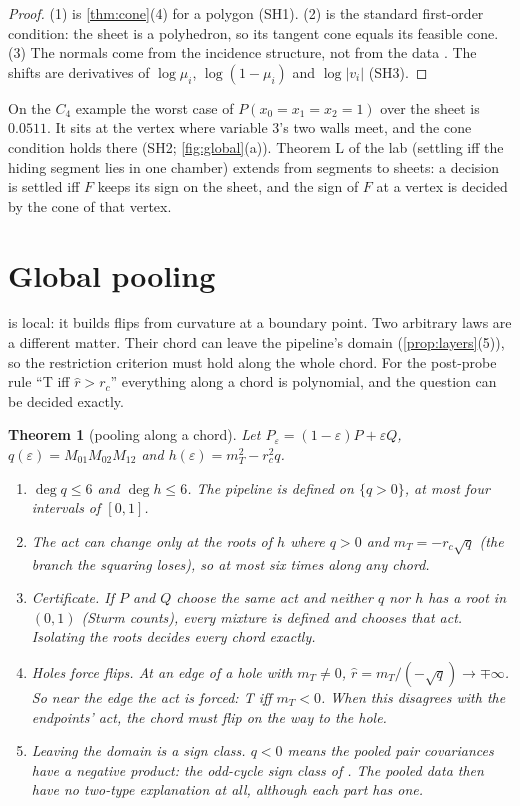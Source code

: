 \documentclass[11pt]{article}
\newtheorem{theorem}{Theorem}\newtheorem{proposition}[theorem]{Proposition}\newtheorem{lemma}[theorem]{Lemma}\newtheorem{corollary}[theorem]{Corollary}
\theoremstyle{definition}\newtheorem{definition}[theorem]{Definition}\newtheorem{remark}[theorem]{Remark}\newtheorem{example}[theorem]{Example}
\begin{document}
\begin{proof}
(1) is \cref{thm:cone}(4) for a polygon (SH1). (2) is the standard first-order condition: the sheet is a polyhedron, so its tangent cone
equals its feasible cone. (3) The normals come from the incidence structure, not from the data \cite[Theorem 5]{Covers}. The shifts are
derivatives of $\log\mu_i$, $\log(1-\mu_i)$ and $\log|v_i|$ (SH3).
\end{proof}

On the $C_4$ example the worst case of $P(x_0=x_1=x_2=1)$ over the sheet is $0.0511$. It sits at the vertex where variable $3$'s two
walls meet, and the cone condition holds there (SH2; \cref{fig:global}(a)). Theorem L of the lab (settling iff the hiding segment lies in
one chamber) extends from segments to sheets: a decision is settled iff $F$ keeps its sign on the sheet, and the sign of $F$ at a vertex is
decided by the cone of that vertex.

\section{Global pooling}\label{sec:global}
 is local: it builds flips from curvature at a boundary point. Two arbitrary laws are a different matter. Their chord can
leave the pipeline's domain (\cref{prop:layers}(5)), so the restriction criterion must hold along the whole chord. For the post-probe rule
``T iff $\hat r>r_c$'' everything along a chord is polynomial, and the question can be decided exactly.

\begin{theorem}[pooling along a chord]\label{thm:global}
Let $P_\varepsilon=(1-\varepsilon)P+\varepsilon Q$, $q(\varepsilon)=M_{01}M_{02}M_{12}$ and $h(\varepsilon)=m_T^2-r_c^2q$.
\begin{enumerate}
\item[(1)] $\deg q\le6$ and $\deg h\le6$. The pipeline is defined on $\{q>0\}$, at most four intervals of $[0,1]$.
\item[(2)] The act can change only at the roots of $h$ where $q>0$ and $m_T=-r_c\sqrt q$ (the branch the squaring loses), so at most six
  times along any chord.
\item[(3)] \emph{Certificate.} If $P$ and $Q$ choose the same act and neither $q$ nor $h$ has a root in $(0,1)$ (Sturm counts), every
  mixture is defined and chooses that act. Isolating the roots decides every chord exactly.
\item[(4)] \emph{Holes force flips.} At an edge of a hole with $m_T\ne0$, $\hat r=m_T/(-\sqrt q)\to\mp\infty$. So near the edge the act is
  forced: T iff $m_T<0$. When this disagrees with the endpoints' act, the chord must flip on the way to the hole.
\item[(5)] \emph{Leaving the domain is a sign class.} $q<0$ means the pooled pair covariances have a negative product: the odd-cycle sign
  class of \cite[Theorem 14]{Covers}. The pooled data then have no two-type explanation at all, although each part has one.
\end{enumerate}
\end{theorem}
\end{document}
